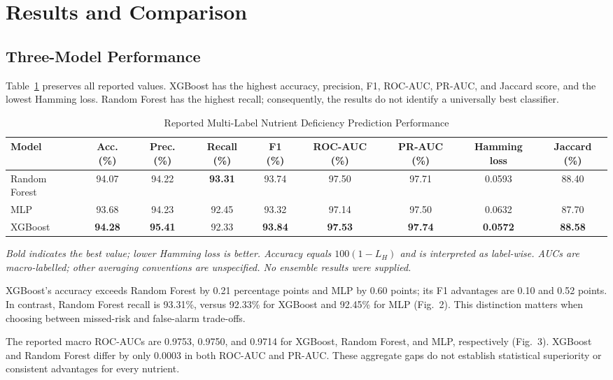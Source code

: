 \documentclass[conference]{IEEEtran}
\begin{document}
\section{Results and Comparison}
\label{sec:results}

\subsection{Three-Model Performance}
Table~\ref{tab:model_performance} preserves all reported values. XGBoost has the highest accuracy, precision, F1, ROC-AUC, PR-AUC, and Jaccard score, and the lowest Hamming loss. Random Forest has the highest recall; consequently, the results do not identify a universally best classifier.

\begin{table}[t]
\centering
\caption{Reported Multi-Label Nutrient Deficiency Prediction Performance}
\label{tab:model_performance}
\begin{tabular}{lcccccccc}
\toprule
\textbf{Model} & \textbf{Acc. (\%)} & \textbf{Prec. (\%)} & \textbf{Recall (\%)} & \textbf{F1 (\%)} & \textbf{ROC-AUC (\%)} & \textbf{PR-AUC (\%)} & \textbf{Hamming loss} & \textbf{Jaccard (\%)} \\
\midrule
Random Forest & 94.07 & 94.22 & \textbf{93.31} & 93.74 & 97.50 & 97.71 & 0.0593 & 88.40 \\
MLP & 93.68 & 94.23 & 92.45 & 93.32 & 97.14 & 97.50 & 0.0632 & 87.70 \\
XGBoost & \textbf{94.28} & \textbf{95.41} & 92.33 & \textbf{93.84} & \textbf{97.53} & \textbf{97.74} & \textbf{0.0572} & \textbf{88.58} \\
\bottomrule
\end{tabular}
\begin{flushleft}
\small{\textit{Bold indicates the best value; lower Hamming loss is better. Accuracy equals $100(1 - L_H)$ and is interpreted as label-wise. AUCs are macro-labelled; other averaging conventions are unspecified. No ensemble results were supplied.}}
\end{flushleft}
\end{table}

XGBoost's accuracy exceeds Random Forest by 0.21 percentage points and MLP by 0.60 points; its F1 advantages are 0.10 and 0.52 points. In contrast, Random Forest recall is 93.31\%, versus 92.33\% for XGBoost and 92.45\% for MLP (Fig.~2). This distinction matters when choosing between missed-risk and false-alarm trade-offs.

The reported macro ROC-AUCs are 0.9753, 0.9750, and 0.9714 for XGBoost, Random Forest, and MLP, respectively (Fig.~3). XGBoost and Random Forest differ by only 0.0003 in both ROC-AUC and PR-AUC. These aggregate gaps do not establish statistical superiority or consistent advantages for every nutrient.
\end{document}
